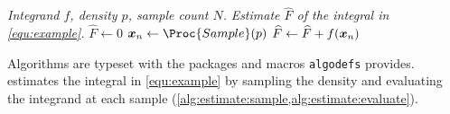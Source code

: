 \documentclass[runningheads]{llncs}
\begin{document}
\begin{algorithm}[t]
	\caption{$(f, p, N)$}
	\label{alg:estimate}
	\begin{algorithmic}[1]
		\Require \textit{Integrand $f$, density $p$, sample count $N$.}
		\Ensure \textit{Estimate $\widehat{F}$ of the integral in \cref{equ:example}.}
		\State $\widehat{F} \gets 0$
			\ENDCOMMENT
			\State $\bm{x}_n \gets \Proc{Sample}(p)$ \label{alg:estimate:sample}
			\ENDCOMMENT
			\State $\widehat{F} \gets \widehat{F} + f \lparen\bm{x}_n\rparen$ \label{alg:estimate:evaluate}
		\ENDFORDO
		\RETURN[$\widehat{F} / N$]\ENDRETURN
	\end{algorithmic}
\end{algorithm}

Algorithms are typeset with the packages and macros \texttt{algodefs} provides.  estimates the integral in \cref{equ:example} by sampling the density and evaluating the integrand at each sample (\cref{alg:estimate:sample,alg:estimate:evaluate}).



\end{document}
